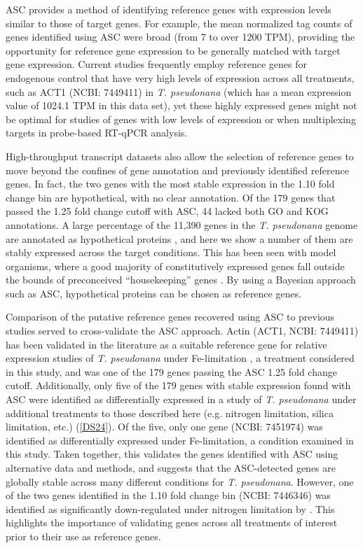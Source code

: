 	ASC provides a method of identifying reference genes with expression levels similar to those of target genes. For example, the mean normalized tag counts of genes identified using ASC were broad (from 7 to over 1200 TPM), providing the opportunity for reference gene expression to be generally matched with target gene expression. Current studies frequently employ reference genes for endogenous control that have very high levels of expression across all treatments, such as ACT1 (NCBI: 7449411) in \textit{T. pseudonana} (which has a mean expression value of 1024.1 TPM in this data set), yet these highly expressed genes might not be optimal for studies of genes with low levels of expression or when multiplexing targets in probe-based RT-qPCR analysis. \par
	High-throughput transcript datasets also allow the selection of reference genes to move beyond the confines of gene annotation and previously identified reference genes. In fact, the two genes with the most stable expression in the 1.10 fold change bin are hypothetical, with no clear annotation. Of the 179 genes that passed the 1.25 fold change cutoff with ASC, 44 lacked both GO and KOG annotations. A large percentage of the 11,390 genes in the \textit{T. pseudonana} genome are annotated as hypothetical proteins \citep{Armbrust2004, Mock2008}, and here we show a number of them are stably expressed across the target conditions. This has been seen with model organisms, where a good majority of constitutively expressed genes fall outside the bounds of preconceived ``housekeeping'' genes \citep{Czechowski2005, DeJonge2007a}. By using a Bayesian approach such as ASC, hypothetical proteins can be chosen as reference genes. \par
    Comparison of the putative reference genes recovered using ASC to previous studies served to cross-validate the ASC approach. Actin (ACT1, NCBI: 7449411) has been validated in the literature as a suitable reference gene for relative expression studies of \textit{T. pseudonana} under Fe-limitation \citep{Whitney2011a}, a treatment considered in this study, and was one of the 179 genes passing the ASC 1.25 fold change cutoff. Additionally, only five of the 179 genes with stable expression found with ASC were identified as differentially expressed in a study of \textit{T. pseudonana} under additional treatments to those described here (e.g. nitrogen limitation, silica limitation, etc.) \citep{Mock2008} (\ref{DS24}). Of the five, only one gene (NCBI: 7451974) was identified as differentially expressed under Fe-limitation, a condition examined in this study. Taken together, this validates the genes identified with ASC using alternative data and methods, and suggests that the ASC-detected genes are globally stable across many different conditions for \textit{T. pseudonana}. However, one of the two genes identified in the 1.10 fold change bin (NCBI: 7446346) was identified as significantly down-regulated under nitrogen limitation by \citet{Mock2008}. This highlights the importance of validating genes across all treatments of interest prior to their use as reference genes. \par

